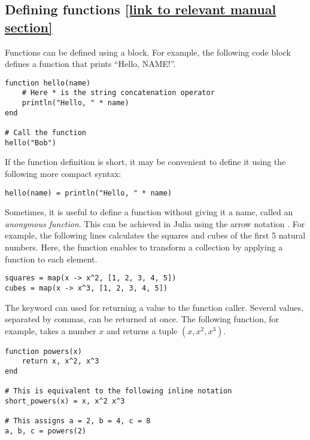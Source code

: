 \subsection*{Defining functions {\footnotesize \href{https://docs.julialang.org/en/v1/manual/functions/} {[link to relevant manual section]}}}%
\label{sub:defining_functions}
Functions can be defined using a  block.
For example, the following code block defines a function that prints ``Hello, NAME!''.

\begin{verbatim}
function hello(name)
    # Here * is the string concatenation operator
    println("Hello, " * name)
end

# Call the function
hello("Bob")
\end{verbatim}

If the function definition is short,
it may be convenient to define it using the following more compact syntax:
\begin{verbatim}
hello(name) = println("Hello, " * name)
\end{verbatim}

Sometimes, it is useful to define a function without giving it a name, called an \emph{anonymous function}.
This can be achieved in Julia using the arrow notation \julia{->}.
For example, the following lines calculates the squares and cubes of the first 5 natural numbers.
Here, the function  enables to transform a collection by applying a function to each element.
\begin{verbatim}
squares = map(x -> x^2, [1, 2, 3, 4, 5])
cubes = map(x -> x^3, [1, 2, 3, 4, 5])
\end{verbatim}

The  keyword can used for returning a value to the function caller.
Several values, separated by commas, can be returned at once.
The following function, for example, takes a number $x$ and returns a tuple $(x, x^2, x^3)$.
\begin{verbatim}
function powers(x)
    return x, x^2, x^3
end

# This is equivalent to the following inline notation
short_powers(x) = x, x^2 x^3

# This assigns a = 2, b = 4, c = 8
a, b, c = powers(2)
\end{verbatim}

